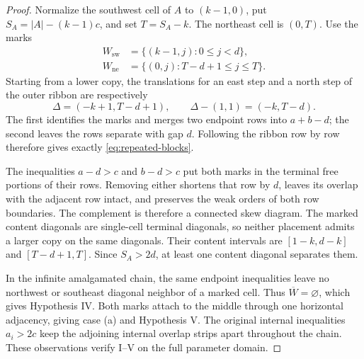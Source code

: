 \documentclass[11pt,a4paper]{amsart}
\numberwithin{equation}{section}
\theoremstyle{plain}
\theoremstyle{definition}
\begin{document}
\begin{proof}
Normalize the southwest cell of \(A\) to \((k-1,0)\), put
\(S_A=|A|-(k-1)c\), and set \(T=S_A-k\).  The northeast cell
is \((0,T)\).  Use the marks
\begin{equation}\label{eq:saturation-marks}
 \begin{aligned}
 W_{\mathrm{sw}}&=\{(k-1,j):0\le j<d\},\\
 W_{\mathrm{ne}}&=\{(0,j):T-d+1\le j\le T\}.
 \end{aligned}
\end{equation}
Starting from a lower copy, the translations for an east step and a north
step of the outer ribbon are respectively
\begin{equation}\label{eq:saturation-translations}
 \Delta=(-k+1,T-d+1),\qquad
 \Delta-(1,1)=(-k,T-d).
\end{equation}
The first identifies the marks and merges two endpoint rows into
\(a+b-d\); the second leaves the rows separate with gap \(d\).
Following the ribbon row by row therefore gives exactly
\eqref{eq:repeated-blocks}.

The inequalities \(a-d>c\) and \(b-d>c\) put both marks in the
terminal free portions of their rows.  Removing either shortens that
row by \(d\), leaves its overlap with the adjacent row intact, and
preserves the weak orders of both row boundaries.  The complement is
therefore a connected skew diagram.  The marked content diagonals are
single-cell terminal diagonals, so neither placement admits a larger
copy on the same diagonals.  Their content intervals are
\([1-k,d-k]\) and \([T-d+1,T]\).  Since \(S_A>2d\), at least
one content diagonal separates them.

In the infinite amalgamated chain, the same endpoint inequalities leave
no northwest or southeast diagonal neighbor of a marked cell.  Thus
\(\overline W=\varnothing\), which gives Hypothesis IV.  Both
marks attach to the middle through one horizontal adjacency, giving
case (a) and Hypothesis V.  The original internal inequalities
\(a_i>2c\) keep the adjoining internal overlap strips apart throughout
the chain.  These observations verify I--V on the full parameter domain.
\end{proof}
\end{document}
